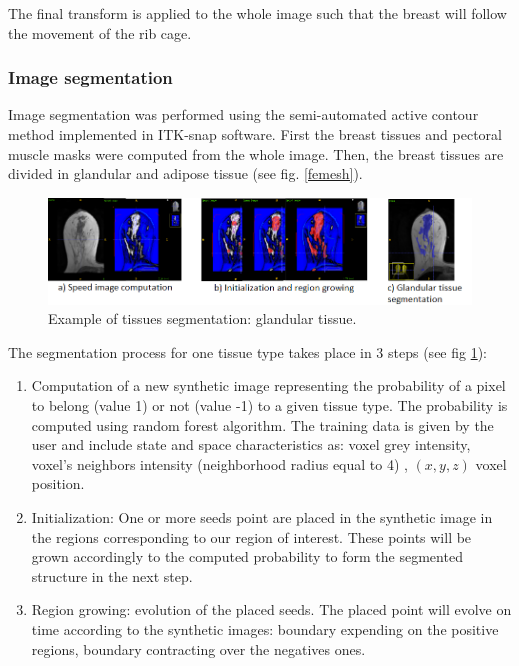  The final transform is applied to the whole image such that the breast will follow the movement of the rib cage.

\subsubsection*{Image segmentation}
Image segmentation was performed using the semi-automated active contour method implemented in ITK-snap software. First the breast tissues and pectoral muscle masks were computed from the whole image. Then, the breast tissues are divided in glandular and adipose tissue (see fig. \ref{femesh}). 

\begin{center}
\begin{figure}[h]
\centerline{\includegraphics[width=\textwidth,height=\textheight,keepaspectratio]{figures/segmentation.png} }
\caption{Example of tissues segmentation: glandular tissue.}
\label{segmentation}
\end{figure}
\end{center}

The segmentation process for one tissue type takes place in 3 steps (see fig \ref{segmentation}): 
\begin{enumerate}
\item Computation of a new synthetic image representing the probability of a pixel to belong (value 1) or not (value -1) to a given tissue type. The probability is computed using random forest algorithm. The training data is given by the user and include state and space characteristics as: voxel grey intensity, voxel's neighbors intensity (neighborhood radius equal to 4) , $(x,y,z)$ voxel position. \\

\item Initialization: One or more seeds point are placed in the synthetic image in the regions corresponding to our region of interest. These points will be grown accordingly to the computed probability to form the segmented structure in the next step. \\
\item Region growing: evolution of the placed seeds. The placed point will evolve on time according to the synthetic images: boundary expending on the positive regions, boundary contracting over the negatives ones.\\
\end{enumerate}
